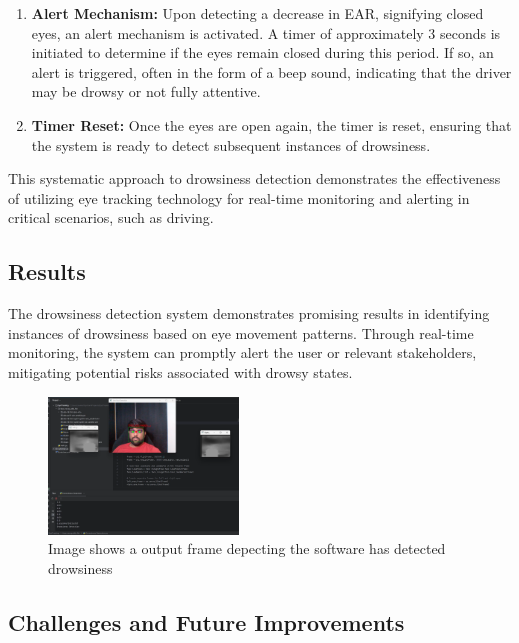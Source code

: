 \documentclass[letterpaper, 10 pt, conference]{ieeeconf}  %
\begin{document}
\begin{enumerate}
    \item \textbf{Alert Mechanism:} Upon detecting a decrease in EAR, signifying closed eyes, an alert mechanism is activated. A timer of approximately 3 seconds is initiated to determine if the eyes remain closed during this period. If so, an alert is triggered, often in the form of a beep sound, indicating that the driver may be drowsy or not fully attentive.

    \item \textbf{Timer Reset:} Once the eyes are open again, the timer is reset, ensuring that the system is ready to detect subsequent instances of drowsiness.

\end{enumerate}

This systematic approach to drowsiness detection demonstrates the effectiveness of utilizing eye tracking technology for real-time monitoring and alerting in critical scenarios, such as driving.

\subsection{Results}

The drowsiness detection system demonstrates promising results in identifying instances of drowsiness based on eye movement patterns. Through real-time monitoring, the system can promptly alert the user or relevant stakeholders, mitigating potential risks associated with drowsy states.

\begin{figure}
  \centering
  \includegraphics[width=0.45\textwidth]{Drowsiness1.png} %
  \caption{Image shows a output frame depecting the software has detected drowsiness }
  \label{fig:your_label}
\end{figure}

\subsection{Challenges and Future Improvements}
\end{document}
